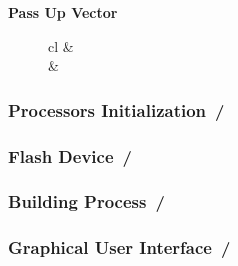 \documentclass{beamer}
\begin{document}
\begin{frame}
\begin{center}
\begin{minipage}{0.45\textwidth}
\begin{block}{\textbf{Pass Up Vector}}
\begin{figure}[h]
\begin{tabular}{cl}
						 &  \\ 
						                                                                     &
					\end{tabular}
				\end{figure}
			\end{block}
		\end{minipage}
	\end{center}
\end{frame}

\begin{frame}
	\frametitle{Processors Initialization \hspace{0pt plus 1 filll} \insertframenumber\,/\,\inserttotalframenumber}
\end{frame}

\begin{frame}
	\frametitle{Flash Device \hspace{0pt plus 1 filll} \insertframenumber\,/\,\inserttotalframenumber}
\end{frame}

\begin{frame}
	\frametitle{Building Process \hspace{0pt plus 1 filll} \insertframenumber\,/\,\inserttotalframenumber}
\end{frame}

\begin{frame}
	\frametitle{Graphical User Interface \hspace{0pt plus 1 filll} \insertframenumber\,/\,\inserttotalframenumber}
\end{frame}
\end{document}

